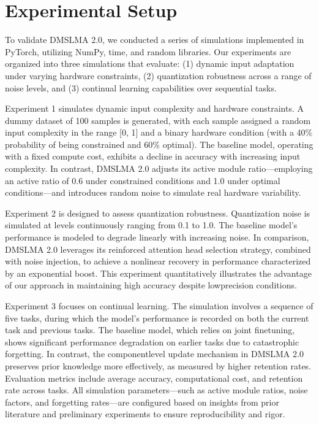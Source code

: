\documentclass{article} %
\begin{document}
\section{Experimental Setup}
\label{sec:experimental}
To validate DMS\-LMA 2.0, we conducted a series of simulations implemented in PyTorch, utilizing NumPy, time, and random libraries. Our experiments are organized into three simulations that evaluate: (1) dynamic input adaptation under varying hardware constraints, (2) quantization robustness across a range of noise levels, and (3) continual learning capabilities over sequential tasks.

Experiment 1 simulates dynamic input complexity and hardware constraints. A dummy dataset of 100 samples is generated, with each sample assigned a random input complexity in the range [0, 1] and a binary hardware condition (with a 40\% probability of being constrained and 60\% optimal). The baseline model, operating with a fixed compute cost, exhibits a decline in accuracy with increasing input complexity. In contrast, DMS\-LMA 2.0 adjusts its active module ratio—employing an active ratio of 0.6 under constrained conditions and 1.0 under optimal conditions—and introduces random noise to simulate real hardware variability.

Experiment 2 is designed to assess quantization robustness. Quantization noise is simulated at levels continuously ranging from 0.1 to 1.0. The baseline model’s performance is modeled to degrade linearly with increasing noise. In comparison, DMS\-LMA 2.0 leverages its reinforced attention head selection strategy, combined with noise injection, to achieve a nonlinear recovery in performance characterized by an exponential boost. This experiment quantitatively illustrates the advantage of our approach in maintaining high accuracy despite low\-precision conditions.

Experiment 3 focuses on continual learning. The simulation involves a sequence of five tasks, during which the model’s performance is recorded on both the current task and previous tasks. The baseline model, which relies on joint fine\-tuning, shows significant performance degradation on earlier tasks due to catastrophic forgetting. In contrast, the component\-level update mechanism in DMS\-LMA 2.0 preserves prior knowledge more effectively, as measured by higher retention rates. Evaluation metrics include average accuracy, computational cost, and retention rate across tasks. All simulation parameters—such as active module ratios, noise factors, and forgetting rates—are configured based on insights from prior literature \cite{fan2020training, sun2019lamol} and preliminary experiments to ensure reproducibility and rigor.
\end{document}
